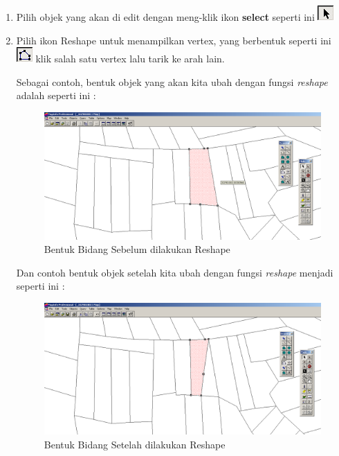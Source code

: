 \begin{enumerate}[\bfseries A.]
\begin{enumerate}[1.]
    \item Pilih objek yang akan di edit dengan meng-klik ikon \textbf{select} seperti ini \includegraphics{./resources/008-ikon-select}
    
    \item Pilih ikon Reshape untuk menampilkan vertex, yang berbentuk seperti ini \includegraphics{./resources/009-ikon-reshape} klik salah satu vertex lalu tarik ke arah lain.
    
    Sebagai contoh, bentuk objek yang akan kita ubah dengan fungsi \textit{reshape} adalah seperti ini :
    
    \begin{figure}[H]
      \centering
      \includegraphics[width=1\textwidth]{./resources/010-sebelum-reshape}
      \caption{Bentuk Bidang Sebelum dilakukan Reshape}
    \end{figure}
    
    Dan contoh bentuk objek setelah kita ubah dengan fungsi \textit{reshape} menjadi seperti ini :
    
    \begin{figure}[H]
      \centering
      \includegraphics[width=1\textwidth]{./resources/011-sesudah-reshape}
      \caption{Bentuk Bidang Setelah dilakukan Reshape}
    \end{figure}
    

\end{enumerate}
\end{enumerate}
